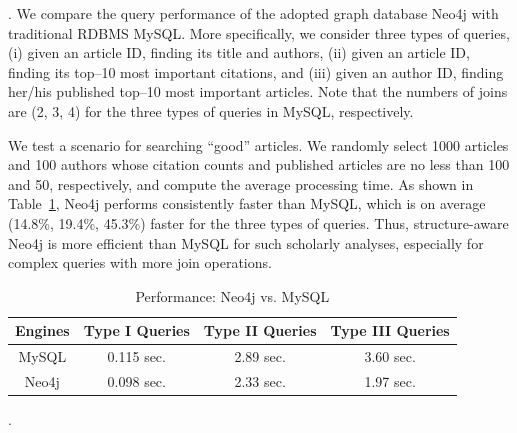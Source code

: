 



.
We compare the query performance of the adopted graph database Neo4j with traditional RDBMS MySQL. More specifically, we consider three types of queries, \ie (i) given an article ID, finding its title and authors, (ii)  given an article ID, finding its top--10 most important citations, and (iii) given an author ID, finding her/his published top--10 most important articles. Note that the numbers of joins are (2, 3, 4) for the three types of queries in MySQL, respectively.

We test a scenario for searching ``good'' articles. We randomly select 1000 articles and 100 authors whose citation counts and published articles are no less than 100 and 50, respectively, and compute the average processing time. As shown in Table~\ref{tab-compare}, Neo4j performs consistently faster than MySQL, which is on average (14.8\%, 19.4\%, 45.3\%) faster for the three types of queries.
Thus, structure-aware Neo4j is more efficient than MySQL for such scholarly analyses, especially for complex queries with more join operations.


\begin{table}[t!]
\begin{center}
\caption{Performance: Neo4j vs. MySQL}
\label{tab-compare}
\begin{scriptsize}

\begin{tabular}{|c|c|c|c|} %
\hline
{Engines} & {Type I Queries} & {Type II Queries} & {Type III  Queries}\\
\hline %
MySQL & 0.115 sec.  & 2.89 sec. & 3.60 sec. \\
\hline
Neo4j & 0.098 sec.  & 2.33 sec. & 1.97 sec. \\
\hline
\end{tabular}

\end{scriptsize}
\vspace{-4.5ex}
\end{center}
\end{table}

.

